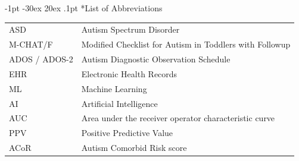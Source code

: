 \documentclass[onecolumn, compsoc,11pt]{IEEEtran}
\makeatletter
\renewcommand\section{\@startsection {section}{1}{\z@}%
                                   {-1pt \@plus -30ex \@minus 20ex}%
                                   {.1pt}%
                                   {\large\bfseries\scshape}}
\renewcommand{\captionN}[1]{\caption{\color{CadetBlue4!80!black} \sffamily \fontsize{9}{10}\selectfont #1  }}
\makeatother
\begin{document}
\section*{List of Abbreviations}
\begin{table}[!ht]
  \hspace{-10pt}
  \begin{tabular}{|R{1.6in}|L{3.55in}|}\hline
   ASD & Autism Spectrum Disorder\\
  M-CHAT/F & Modified Checklist for Autism in Toddlers with Followup\\
  ADOS / ADOS-2 & Autism Diagnostic Observation Schedule \\
  EHR  & Electronic Health Records \\
  ML  & Machine Learning \\
  AI  & Artificial Intelligence \\
    AUC  & Area under the receiver operator characteristic curve \\
        PPV  & Positive Predictive Value \\
  {\color{Red3} ACoR} & {\color{Red3} Autism Comorbid Risk score} \\\hline
  \end{tabular}
  \end{table}
\clearpage
 
{\fontsize{9}{10}\selectfont


}
\end{document}

